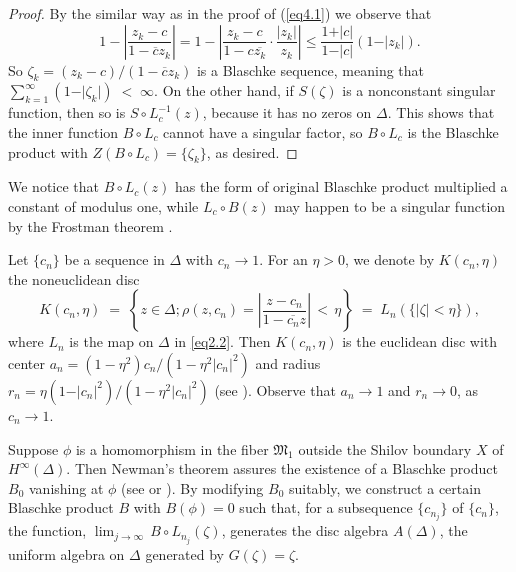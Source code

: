 \documentclass[12pt]{amsart}
\theoremstyle{plain}
\numberwithin{equation}{section}
\begin{document}
\begin{proof}
By the similar way as in the proof of (\ref{eq4.1}) we observe that
\begin{equation*}
1 - \left \vert
\frac{z_k - c}{1 - \overline{c}z_k} \right \vert
= 1 - \left \vert
\frac{z_k - c}{1 - c\overline{z_k}}\cdot
\frac{\vert z_k\vert}{z_k} \right \vert
\leq
\frac{1+\vert c \vert}{1-\vert c \vert}(1-\vert z_k\vert).
\end{equation*}
So $ \zeta_k=(z_k - c)/(1 - \overline{c}z_k)$ is a Blaschke sequence,
meaning that $\sum_{k=1}^\infty (1-\vert \zeta_k\vert)\; <\;\infty.$
On the other hand, if $S(\zeta)$ is a nonconstant singular function,
then so is $S\circ L_c^{-1}(z)$, because it has no zeros on $\Delta$.
This shows that the inner function $B\circ L_c$ cannot have a singular
factor, so $B\circ L_c$ is the Blaschke product with
$Z(B\circ L_c)=\{\zeta_k\}$, as desired.
\end{proof}
We notice that $B\circ L_c(z)$ has the form of original Blaschke product
multiplied a constant of modulus one, while $L_c\circ B (z)$ may happen
to be a singular function by the Frostman theorem
\cite[Chapter II, Theorem 6.4]{Ga}.

\medskip
Let $\{c_n\}$ be a sequence in $\Delta$ with $c_n \to 1$. For an
$\eta >0$, we denote by $K(c_n,\eta)$ the noneuclidean disc
\begin{equation*}
K(c_n,\eta)\;=\;\left\{z\in \Delta ; \rho(z,c_n)= \left \vert
\frac{z - c_n}{1 - \overline{c_n}z} \right \vert\, < \,\eta \right\}
\;=\; L_n(\{\vert \zeta \vert < \eta \}),
\end{equation*}
where $L_n $ is the map on $\Delta$ in \eqref{eq2.2}.
Then $K(c_n,\eta)$ is the euclidean disc with center
$a_n = (1 - \eta^2)c_n/(1 - \eta^2\vert c_n\vert^2)$ and radius
$r_n = \eta(1 - \vert c_n\vert^2)/(1 - \eta^2\vert c_n\vert^2)$
(see \cite[Chapter I, \S 1]{Ga}). Observe that $a_n  \to 1$
and $r_n \to 0$, as $c_n \to 1$.

Suppose $\phi$ is a homomorphism in the fiber $\mathfrak{M}_1$
outside the Shilov boundary $X$ of $H^\infty(\Delta)$. Then Newman's
theorem assures the existence of a Blaschke product $B_0$  vanishing at
$\phi$ (see \cite [Chapter 10]{H} or \cite [Chapter V, Theoem 2.2]{Ga}).
By modifying $B_0$ suitably, we construct a certain Blaschke
product $B$ with $B(\phi) = 0$ such that,
for a subsequence $\{c_{n_j}\}$ of $\{c_n\}$, the function,
$\lim_{j\to\infty}\,B\circ L_{n_j}(\zeta)$, generates
the disc algebra $A(\Delta)$, the uniform algebra on $\Delta$
generated by $G(\zeta)=\zeta$.
\end{document}
